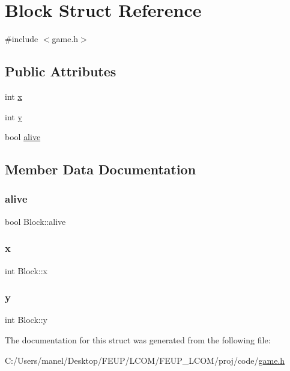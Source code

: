 \hypertarget{struct_block}{}\section{Block Struct Reference}
\label{struct_block}


{\ttfamily \#include $<$game.\+h$>$}

\subsection*{Public Attributes}
\begin{DoxyCompactItemize}
\item 
int \mbox{\hyperlink{struct_block_a13d0a6d225233353862fa5adcbadf661}{x}}
\item 
int \mbox{\hyperlink{struct_block_a9328d6b6fcc9f9c019d091d87ceda41c}{y}}
\item 
bool \mbox{\hyperlink{struct_block_ace17e5300d4d90b70136387c91a830c5}{alive}}
\end{DoxyCompactItemize}


\subsection{Member Data Documentation}
\mbox{\label{struct_block_ace17e5300d4d90b70136387c91a830c5}} 
\subsubsection{\texorpdfstring{alive}{alive}}
{\footnotesize\ttfamily bool Block\+::alive}

\mbox{\label{struct_block_a13d0a6d225233353862fa5adcbadf661}} 
\subsubsection{\texorpdfstring{x}{x}}
{\footnotesize\ttfamily int Block\+::x}

\mbox{\label{struct_block_a9328d6b6fcc9f9c019d091d87ceda41c}} 
\subsubsection{\texorpdfstring{y}{y}}
{\footnotesize\ttfamily int Block\+::y}



The documentation for this struct was generated from the following file\+:\begin{DoxyCompactItemize}
\item 
C\+:/\+Users/manel/\+Desktop/\+F\+E\+U\+P/\+L\+C\+O\+M/\+F\+E\+U\+P\+\_\+\+L\+C\+O\+M/proj/code/\mbox{\hyperlink{game_8h}{game.\+h}}\end{DoxyCompactItemize}
